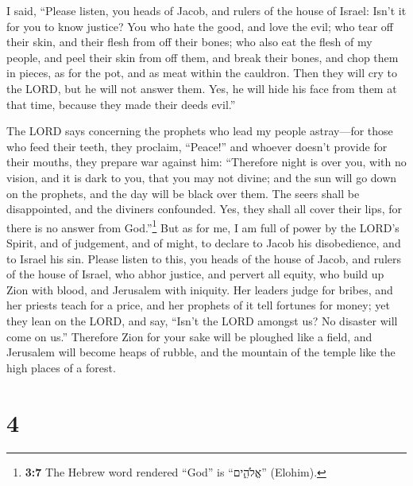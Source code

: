  I said, ``Please listen, you heads of Jacob, and rulers
of the house of Israel: Isn't it for you to know justice? 
You who hate the good, and love the evil; who tear off their skin, and
their flesh from off their bones;  who also eat the flesh
of my people, and peel their skin from off them, and break their bones,
and chop them in pieces, as for the pot, and as meat within the
cauldron.  Then they will cry to the LORD, but he will not
answer them. Yes, he will hide his face from them at that time, because
they made their deeds evil.''

 The LORD says concerning the prophets who lead my people
astray---for those who feed their teeth, they proclaim, ``Peace!'' and
whoever doesn't provide for their mouths, they prepare war against him:
 ``Therefore night is over you, with no vision, and it is
dark to you, that you may not divine; and the sun will go down on the
prophets, and the day will be black over them.  The seers
shall be disappointed, and the diviners confounded. Yes, they shall all
cover their lips, for there is no answer from God.''\footnote{\textbf{3:7}
  The Hebrew word rendered ``God'' is ``אֱלֹהִ֑ים'' (Elohim).}
 But as for me, I am full of power by the LORD's Spirit,
and of judgement, and of might, to declare to Jacob his disobedience,
and to Israel his sin.  Please listen to this, you heads
of the house of Jacob, and rulers of the house of Israel, who abhor
justice, and pervert all equity,  who build up Zion with
blood, and Jerusalem with iniquity.  Her leaders judge
for bribes, and her priests teach for a price, and her prophets of it
tell fortunes for money; yet they lean on the LORD, and say, ``Isn't the
LORD amongst us? No disaster will come on us.'' 
Therefore Zion for your sake will be ploughed like a field, and
Jerusalem will become heaps of rubble, and the mountain of the temple
like the high places of a forest.

\hypertarget{section-3}{%
\section{4}\label{section-3}}


